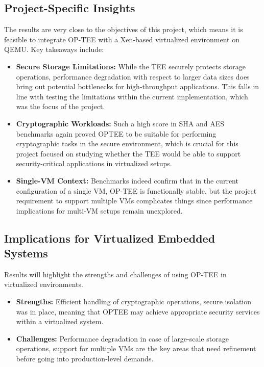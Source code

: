 \documentclass[acmtog]{acmart}
\begin{document}
\subsection{Project-Specific Insights}
The results are very close to the objectives of this project, which means it is feasible to integrate OP-TEE with a Xen-based virtualized environment on QEMU. Key takeaways include:

\begin{itemize}
    \item \textbf{Secure Storage Limitations:} While the TEE securely protects storage operations, performance degradation with respect to larger data sizes does bring out potential bottlenecks for high-throughput applications. This falls in line with testing the limitations within the current implementation, which was the focus of the project.
    \item \textbf{Cryptographic Workloads:} Such a high score in SHA and AES benchmarks again proved OPTEE to be suitable for performing cryptographic tasks in the secure environment, which is crucial for this project focused on studying whether the TEE would be able to support security-critical applications in virtualized setups.
    \item \textbf{Single-VM Context:} Benchmarks indeed confirm that in the current configuration of a single VM, OP-TEE is functionally stable, but the project requirement to support multiple VMs complicates things since performance implications for multi-VM setups remain unexplored.
\end{itemize}

\subsection{Implications for Virtualized Embedded Systems}
Results will highlight the strengths and challenges of using OP-TEE in virtualized environments.
\begin{itemize}
    \item \textbf{Strengths:} Efficient handling of cryptographic operations, secure isolation was in place, meaning that OPTEE may achieve appropriate security services within a virtualized system.
    \item \textbf{Challenges:} Performance degradation in case of large-scale storage operations, support for multiple VMs are the key areas that need refinement before going into production-level demands.
\end{itemize}
\end{document}
